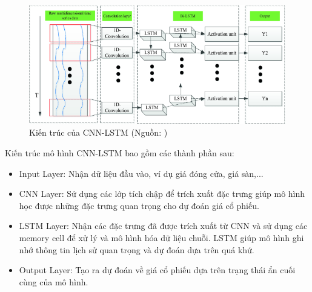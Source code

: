 \documentclass[conference]{IEEEtran}
\begin{document}
\begin{figure}[H]
    \centering
    \begin{minipage}{0.8\linewidth}
    \centering
        \includegraphics[width=0.8\linewidth]{images/CNNLSTM.png}
    \caption{Kiến trúc của CNN-LSTM (Nguồn: \cite{CNNLSTMTimeSeries})}
    \label{fig10}
    \end{minipage}
\end{figure}
Kiến trúc mô hình CNN-LSTM bao gồm các thành phần sau:
\begin{itemize}
    \item Input Layer: Nhận dữ liệu đầu vào, ví dụ giá đóng cửa, giá sàn,...
    \item CNN Layer: Sử dụng các lớp tích chập để trích xuất đặc trưng giúp mô hình học được những đặc trưng quan trọng cho dự đoán giá cổ phiếu.
    \item LSTM Layer: Nhận các đặc trưng đã được trích xuất từ CNN và sử dụng các memory cell để xử lý và mô hình hóa dữ liệu chuỗi. LSTM giúp mô hình ghi nhớ thông tin lịch sử quan trọng và dự đoán dựa trên quá khứ.
    \item Output Layer: Tạo ra dự đoán về giá cổ phiếu dựa trên trạng thái ẩn cuối cùng của mô hình.
\end{itemize}
\end{document}
